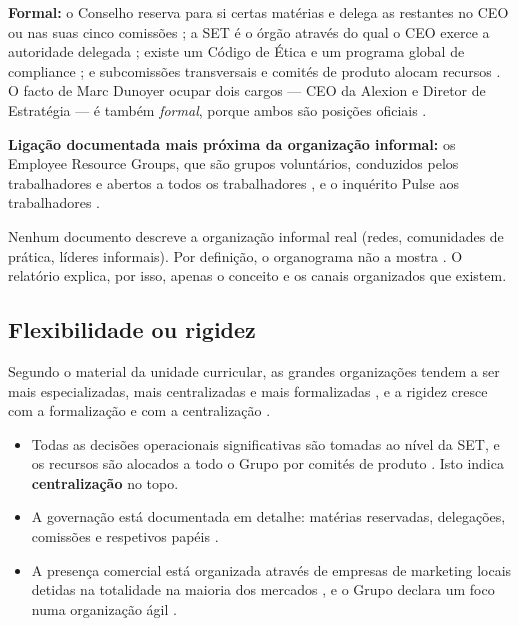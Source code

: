 \textbf{Formal:} o Conselho reserva para si certas matérias e delega as restantes no CEO ou nas suas cinco comissões \cite[p.~67]{AR}; a SET é o órgão através do qual o CEO exerce a autoridade delegada \cite[p.~70]{AR}; existe um Código de Ética e um programa global de compliance \cite[p.~34]{AR}; e subcomissões transversais e comités de produto alocam recursos \cite[p.~147]{AR}. O facto de Marc Dunoyer ocupar dois cargos --- CEO da Alexion e Diretor de Estratégia --- é também \textit{formal}, porque ambos são posições oficiais \cite[p.~70]{AR}.

\textbf{Ligação documentada mais próxima da organização informal:} os Employee Resource Groups, que são grupos voluntários, conduzidos pelos trabalhadores e abertos a todos os trabalhadores \cite[p.~39]{AR}, e o inquérito Pulse aos trabalhadores \cite[p.~39]{AR}.

\begin{sourceslimit}
Nenhum documento descreve a organização informal real (redes, comunidades de prática, líderes informais). Por definição, o organograma não a mostra \cite[p.~12]{ORG}. O relatório explica, por isso, apenas o conceito e os canais organizados que existem.
\end{sourceslimit}

\subsection{Flexibilidade ou rigidez}

Segundo o material da unidade curricular, as grandes organizações tendem a ser mais especializadas, mais centralizadas e mais formalizadas \cite[p.~11]{ORG}, e a rigidez cresce com a formalização \cite[p.~9]{ORG} e com a centralização \cite[p.~7]{ORG}.

\begin{itemize}
\item Todas as decisões operacionais significativas são tomadas ao nível da SET, e os recursos são alocados a todo o Grupo por comités de produto \cite[p.~147]{AR}. Isto indica \textbf{centralização} no topo.
\item A governação está documentada em detalhe: matérias reservadas, delegações, comissões e respetivos papéis \cite[pp.~67, 71]{AR}.
\item A presença comercial está organizada através de empresas de marketing locais detidas na totalidade na maioria dos mercados \cite[p.~32]{AR}, e o Grupo declara um foco numa organização ágil \cite[p.~11]{AR}.
\end{itemize}

